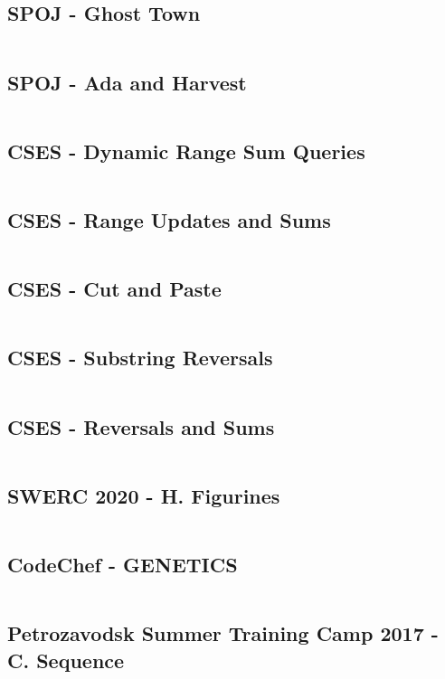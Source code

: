 \subsection{SPOJ - Ghost Town}
\inputminted{c++}{Implementaciones/Ghost_Town.cpp}

\subsection{SPOJ - Ada and Harvest}
\inputminted{c++}{Implementaciones/Ada_and_Harvest.cpp}

\subsection{CSES - Dynamic Range Sum Queries}
\inputminted{c++}{Implementaciones/Dynamic_Range_Sum_Queries.cpp}

\subsection{CSES - Range Updates and Sums}
\inputminted{c++}{Implementaciones/Range_Updates_and_Sums.cpp}

\subsection{CSES - Cut and Paste}
\inputminted{c++}{Implementaciones/Cut_and_Paste.cpp}

\subsection{CSES - Substring Reversals}
\inputminted{c++}{Implementaciones/Substring_Reversals.cpp}

\subsection{CSES - Reversals and Sums}
\inputminted{c++}{Implementaciones/Reversals_and_Sums.cpp}

\subsection{SWERC 2020 - H. Figurines}
\inputminted{c++}{Implementaciones/H_Figurines.cpp}

\subsection{CodeChef - GENETICS}
\inputminted{c++}{Implementaciones/Genetics.cpp}

\subsection{Petrozavodsk Summer Training Camp 2017 - C. Sequence}
\inputminted{c++}{Implementaciones/Sequence.cpp}